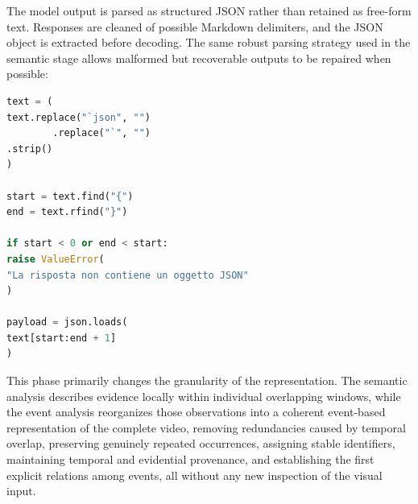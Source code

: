 The model output is parsed as structured JSON rather than retained as free-form text. Responses are cleaned of possible Markdown delimiters, and the JSON object is extracted before decoding. The same robust parsing strategy used in the semantic stage allows malformed but recoverable outputs to be repaired when possible:
\begin{lstlisting}[language=Python]
text = (
text.replace("`json", "")
        .replace("`", "")
.strip()
)

start = text.find("{")
end = text.rfind("}")

if start < 0 or end < start:
raise ValueError(
"La risposta non contiene un oggetto JSON"
)

payload = json.loads(
text[start:end + 1]
)
\end{lstlisting}
This phase primarily changes the granularity of the representation. The semantic analysis describes evidence locally within individual overlapping windows, while the event analysis reorganizes those observations into a coherent event-based representation of the complete video, removing redundancies caused by temporal overlap, preserving genuinely repeated occurrences, assigning stable identifiers, maintaining temporal and evidential provenance, and establishing the first explicit relations among events, all without any new inspection of the visual input.
